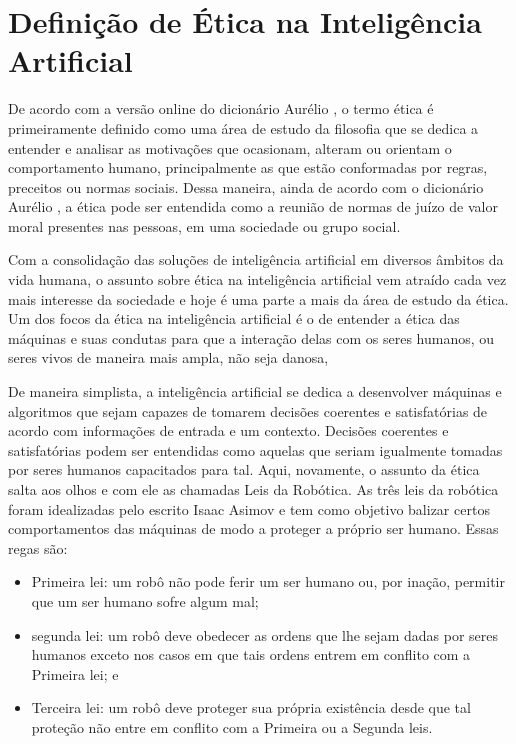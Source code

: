 \documentclass{article}
\begin{document}
\section*{Definição de Ética na Inteligência Artificial}
De acordo com a versão online do dicionário Aurélio \cite{aurelio_online}, o termo ética é primeiramente definido como uma área de estudo da filosofia que se dedica a entender e analisar as motivações que ocasionam, alteram ou orientam o comportamento humano, principalmente as que estão conformadas por regras, preceitos ou normas sociais. Dessa maneira, ainda de acordo com o dicionário Aurélio \cite{aurelio_online}, a ética pode ser entendida como a reunião de normas de juízo de valor moral presentes nas pessoas, em uma sociedade ou grupo social. 

Com a consolidação das soluções de inteligência artificial em diversos âmbitos da vida humana, o assunto sobre ética na inteligência artificial vem atraído cada vez mais interesse da sociedade e hoje é uma parte a mais da área de estudo da ética. Um dos focos da ética na inteligência artificial é o de entender a ética das máquinas e suas condutas para que a interação delas com os seres humanos, ou seres vivos de maneira mais ampla, não seja danosa, 

De maneira simplista, a inteligência artificial se dedica a desenvolver máquinas e algoritmos que sejam capazes de tomarem decisões coerentes e satisfatórias de acordo com informações de entrada e um contexto. Decisões coerentes e satisfatórias podem ser entendidas como aquelas que seriam igualmente tomadas por seres humanos capacitados para tal. Aqui, novamente, o assunto da ética salta aos olhos e com ele as chamadas Leis da Robótica. As três leis da robótica foram idealizadas pelo escrito Isaac Asimov e tem como objetivo balizar certos comportamentos das máquinas de modo a proteger a próprio ser humano. Essas regas são:
\begin{itemize}
	\item Primeira lei: um robô não pode ferir um ser humano ou, por inação, permitir que um ser humano sofre algum mal;
	\item segunda lei: um robô deve obedecer as ordens que lhe sejam dadas por seres humanos exceto nos casos em que tais ordens entrem em conflito com a Primeira lei; e
	\item Terceira lei: um robô deve proteger sua própria existência desde que tal proteção não entre em conflito com a Primeira ou a Segunda leis.
\end{itemize}
\end{document}
